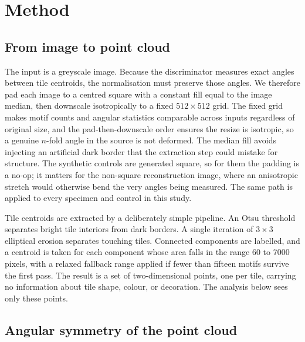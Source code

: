 \documentclass[11pt]{article}
\begin{document}
\section{Method}

\subsection{From image to point cloud}

The input is a greyscale image. Because the discriminator measures exact angles
between tile centroids, the normalisation must preserve those angles. We
therefore pad each image to a centred square with a constant fill equal to the
image median, then downscale isotropically to a fixed $512 \times 512$ grid. The
fixed grid makes motif counts and angular statistics comparable across inputs
regardless of original size, and the pad-then-downscale order ensures the resize
is isotropic, so a genuine $n$-fold angle in the source is not deformed. The
median fill avoids injecting an artificial dark border that the extraction step
could mistake for structure. The synthetic controls are generated square, so for
them the padding is a no-op; it matters for the non-square reconstruction image,
where an anisotropic stretch would otherwise bend the very angles being
measured. The same path is applied to every specimen and control in this study.

Tile centroids are extracted by a deliberately simple pipeline. An Otsu
threshold separates bright tile interiors from dark borders. A single iteration
of $3 \times 3$ elliptical erosion separates touching tiles. Connected
components are labelled, and a centroid is taken for each component whose area
falls in the range 60 to 7000 pixels, with a relaxed fallback range applied if
fewer than fifteen motifs survive the first pass. The result is a set of
two-dimensional points, one per tile, carrying no information about tile shape,
colour, or decoration. The analysis below sees only these points.

\subsection{Angular symmetry of the point cloud}
\end{document}
